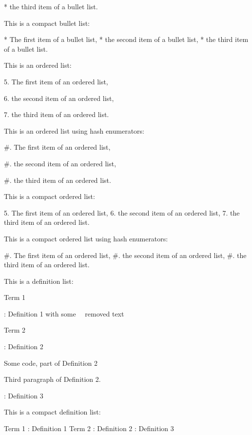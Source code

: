* the third item of a bullet list.

This is a compact bullet list:

* The first item of a bullet list,
* the second item of a bullet list,
* the third item of a bullet list.

This is an ordered list:

5. The first item of an ordered list,

6. the second item of an ordered list,

7. the third item of an ordered list.

This is an ordered list using hash enumerators:

#. The first item of an ordered list,

#. the second item of an ordered list,

#. the third item of an ordered list.

This is a compact ordered list:

5. The first item of an ordered list,
6. the second item of an ordered list,
7. the third item of an ordered list.

This is a compact ordered list using hash enumerators:

#. The first item of an ordered list,
#. the second item of an ordered list,
#. the third item of an ordered list.

This is a definition list:

Term 1

:   Definition 1 with some ~~removed text~~

Term 2

:   Definition 2

        Some code, part of Definition 2

    Third paragraph of Definition 2.

:   Definition 3

This is a compact definition list:

Term 1
:   Definition 1
Term 2
:   Definition 2
:   Definition 3

\markdownEnd

\bye
